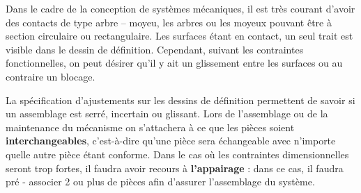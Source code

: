 \documentclass[11pt,oneside]{article}
\begin{document}




Dans le cadre de la conception de systèmes mécaniques, il est très courant d'avoir des contacts de type arbre -- moyeu, les arbres ou les moyeux pouvant être à section circulaire ou rectangulaire. Les surfaces étant en contact, un seul trait est visible dans le dessin de définition. Cependant, suivant les contraintes fonctionnelles, on peut désirer qu'il y ait un glissement entre les surfaces ou au contraire un blocage.

La spécification d'ajustements sur les dessins de définition permettent de savoir si un assemblage est serré, incertain ou glissant. Lors de l'assemblage ou de la maintenance du mécanisme on s'attachera à ce que les pièces soient \textbf{interchangeables}, c'est-à-dire qu'une pièce sera échangeable avec n'importe quelle autre pièce étant conforme. Dans le cas où les contraintes dimensionnelles seront trop fortes, il faudra avoir recours à \textbf{l'appairage} : dans ce cas, il faudra pré - associer 2 ou plus de pièces afin d'assurer l'assemblage du système.







\end{document}
